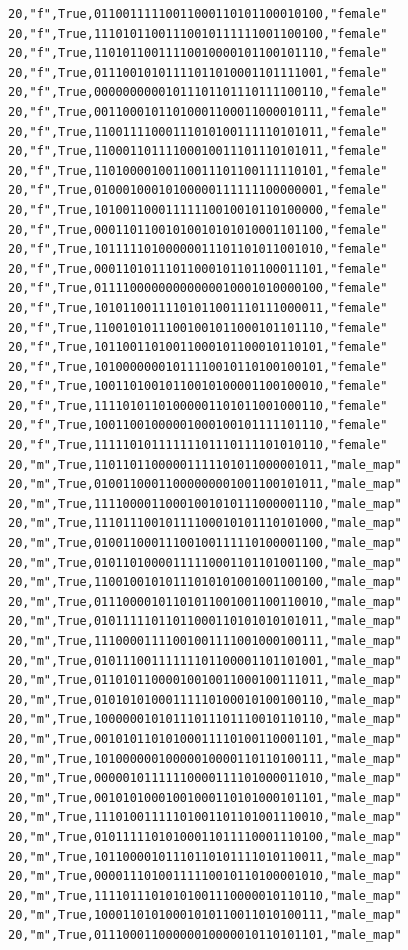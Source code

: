 \documentclass[authoryearcitations]{UoYCSproject}
\begin{document}
\begin{framed}
\begin{verbatim}
20,"f",True,01100111110011000110101100010100,"female"
20,"f",True,11101011001110010111111001100100,"female"
20,"f",True,11010110011110010000101100101110,"female"
20,"f",True,01110010101111011010001101111001,"female"
20,"f",True,00000000001011101101110111100110,"female"
20,"f",True,00110001011010001100011000010111,"female"
20,"f",True,11001111000111010100111110101011,"female"
20,"f",True,11000110111100010011101110101011,"female"
20,"f",True,11010000100110011101100111110101,"female"
20,"f",True,01000100010100000111111100000001,"female"
20,"f",True,10100110001111110010010110100000,"female"
20,"f",True,00011011001010010101010001101100,"female"
20,"f",True,10111110100000011101101011001010,"female"
20,"f",True,00011010111011000101101100011101,"female"
20,"f",True,01111000000000000010001010000100,"female"
20,"f",True,10101100111101011001110111000011,"female"
20,"f",True,11001010111001001011000101101110,"female"
20,"f",True,10110011010011000101100010110101,"female"
20,"f",True,10100000001011110010110100100101,"female"
20,"f",True,10011010010110010100001100100010,"female"
20,"f",True,11110101101000001101011001000110,"female"
20,"f",True,10011001000001000100101111101110,"female"
20,"f",True,11111010111111101110111101010110,"female"
20,"m",True,11011011000001111101011000001011,"male_map"
20,"m",True,01001100011000000001001100101011,"male_map"
20,"m",True,11110000110001001010111000001110,"male_map"
20,"m",True,11101110010111100010101110101000,"male_map"
20,"m",True,01001100011100100111110100001100,"male_map"
20,"m",True,01011010000111110001101101001100,"male_map"
20,"m",True,11001001010111010101001001100100,"male_map"
20,"m",True,01110000101101011001001100110010,"male_map"
20,"m",True,01011111011011000110101010101011,"male_map"
20,"m",True,11100001111001001111001000100111,"male_map"
20,"m",True,01011100111111101100001101101001,"male_map"
20,"m",True,01101011000010010011000100111011,"male_map"
20,"m",True,01010101000111110100010100100110,"male_map"
20,"m",True,10000001010111011101110010110110,"male_map"
20,"m",True,00101011010100011110100110001101,"male_map"
20,"m",True,10100000010000010000110110100111,"male_map"
20,"m",True,00000101111110000111101000011010,"male_map"
20,"m",True,00101010001001000110101000101101,"male_map"
20,"m",True,11101001111101001101101001110010,"male_map"
20,"m",True,01011111010100011011110001110100,"male_map"
20,"m",True,10110000101110110101111010110011,"male_map"
20,"m",True,00001110100111110010110100001010,"male_map"
20,"m",True,11110111010101001110000010110110,"male_map"
20,"m",True,10001101010001010110011010100111,"male_map"
20,"m",True,01110001100000010000010110101101,"male_map"

\end{verbatim}
\end{framed}
\end{document}
